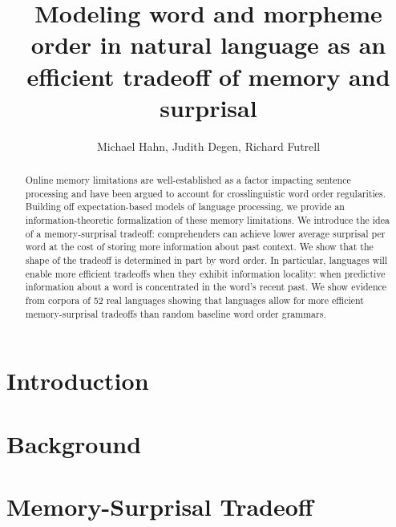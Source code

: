 \documentclass[11pt,letterpaper]{article}
\title{Modeling word and morpheme order in natural language as an efficient tradeoff of memory and surprisal}
\author{Michael Hahn, Judith Degen, Richard Futrell}
\begin{document}
\maketitle


\begin{abstract}
Online memory limitations are well-established as a factor impacting sentence processing and have been argued to account for crosslinguistic word order regularities. Building off expectation-based models of language processing, we provide an information-theoretic formalization of these memory limitations. We introduce the idea of a memory-surprisal tradeoff: comprehenders can achieve lower average surprisal per word at the cost of storing more information about past context. We show that the shape of the tradeoff is determined in part by word order. In particular, languages will enable more efficient tradeoffs when they exhibit information locality: when predictive information about a word is concentrated in the word’s recent past. We show evidence from corpora of 52 real languages showing that languages allow for more efficient memory-surprisal tradeoffs than random baseline word order grammars. 
\end{abstract}


% 


 
\section{Introduction}





\section{Background}\label{sec:background}




\section{Memory-Surprisal Tradeoff}\label{sec:ms-tradeoff}
\end{document}
